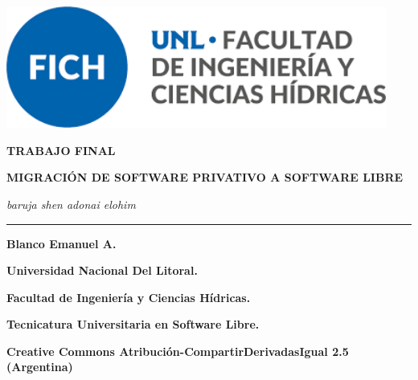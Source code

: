 \begin{center}
	
	\vspace*{2cm}
	
	\includegraphics[width=12.5cm]{imagenes/Portada/fich_logo.png}
	
	\vspace{1cm}
	
	{\color{epsc:oscuro}
		
		\Large\textbf{TRABAJO FINAL}\par	
		
		\vspace{0.2cm}
		
		\textbf{MIGRACIÓN DE SOFTWARE PRIVATIVO A SOFTWARE LIBRE}
		
		\vspace{0.2cm}
		
	} \vspace{2mm}
	
	{\color{epsc:oscuro}
		
		{\itshape{baruja shen adonai elohim}}\vspace{1cm}
		
		{\color{epsc:verde}\rule[2cm]{7cm}{0.3mm}}
		
		\begin{center}
	
			{\large\textbf{Blanco Emanuel A.}}\par
			{\large\textbf{Universidad Nacional Del Litoral.}}\par
			{\large\textbf{Facultad de Ingeniería y Ciencias Hídricas.}} \par
			{\large\textbf{Tecnicatura Universitaria en Software Libre.}}\par
			{\large\textbf{Creative Commons Atribución-CompartirDerivadasIgual 2.5 (Argentina)}}
				
		\end{center}
		
		\vspace{0.7cm}
	
		\textbf{\monthyeardate{\today}}        %
		
	}

\end{center}

\endinput
